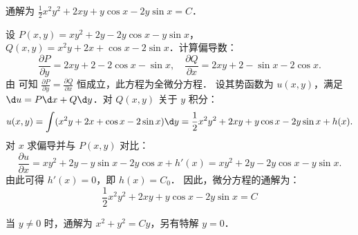 \begin{solution}
     通解为 $\frac{1}{2} x^2 y^2 + 2xy + y \cos x - 2y \sin x = C$．

    设 $P(x,y) = xy^2 + 2y - 2y \cos x - y \sin x$，$Q(x,y) = x^2y + 2x + \cos x - 2 \sin x$．计算偏导数：
    \begin{equation}
        \label{eq:p12-1-exact}
        \frac{\partial P}{\partial y} = 2xy + 2 - 2 \cos x - \sin x, \quad \frac{\partial Q}{\partial x} = 2xy + 2 - \sin x - 2 \cos x.
    \end{equation}
    由  可知 $\frac{\partial P}{\partial y} = \frac{\partial Q}{\partial x}$ 恒成立，此方程为全微分方程．
    设其势函数为 $u(x,y)$，满足 $\d u = P \d x + Q \d y$．对 $Q(x,y)$ 关于 $y$ 积分：
    \begin{equation}
        u(x,y) = \int (x^2y + 2x + \cos x - 2 \sin x) \d y = \frac{1}{2}x^2y^2 + 2xy + y \cos x - 2y \sin x + h(x).
    \end{equation}
    对 $x$ 求偏导并与 $P(x,y)$ 对比：
    \begin{equation}
        \frac{\partial u}{\partial x} = xy^2 + 2y - y \sin x - 2y \cos x + h'(x) = xy^2 + 2y - 2y \cos x - y \sin x.
    \end{equation}
    由此可得 $h'(x) = 0$，即 $h(x) = C_0$．
    因此，微分方程的通解为：
    \begin{equation}
        \boxed{\frac{1}{2} x^2 y^2 + 2xy + y \cos x - 2y \sin x = C}
    \end{equation}

     当 $y\neq 0$ 时，通解为 $x^2 + y^2 = Cy$，另有特解 $y=0$．


\end{solution}
